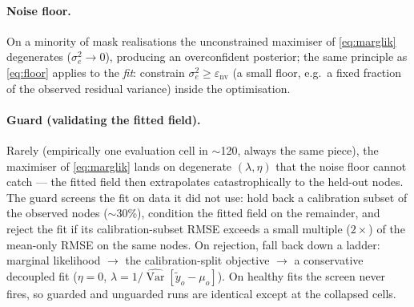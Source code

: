\documentclass[11pt,a4paper]{report}
\begin{document}
\paragraph{Noise floor.}
On a minority of mask realisations the unconstrained maximiser of \eqref{eq:marglik}
degenerates ($\sigma_e^2 \to 0$), producing an overconfident posterior; the same
principle as \eqref{eq:floor} applies to the \emph{fit}: constrain
$\sigma_e^2 \ge \varepsilon_{\mathrm{nv}}$ (a small floor, e.g.\ a fixed fraction of
the observed residual variance) inside the optimisation.

\paragraph{Guard (validating the fitted field).}
Rarely (empirically one evaluation cell in $\sim$120, always the same piece), the
maximiser of \eqref{eq:marglik} lands on degenerate $(\lambda, \eta)$ that the noise
floor cannot catch --- the fitted field then extrapolates catastrophically to the
held-out nodes. The guard screens the fit on data it did not use: hold back a
calibration subset of the observed nodes ($\sim$30\%), condition the fitted field on
the remainder, and reject the fit if its calibration-subset RMSE exceeds a small
multiple ($2\times$) of the mean-only RMSE on the same nodes. On rejection, fall
back down a ladder: marginal likelihood $\to$ the calibration-split objective $\to$ a
conservative decoupled fit ($\eta = 0$,
$\lambda = 1/\widehat{\operatorname{Var}}[\tilde y_o - \mu_o]$). On healthy fits the
screen never fires, so guarded and unguarded runs are identical except at the
collapsed cells.
\end{document}
